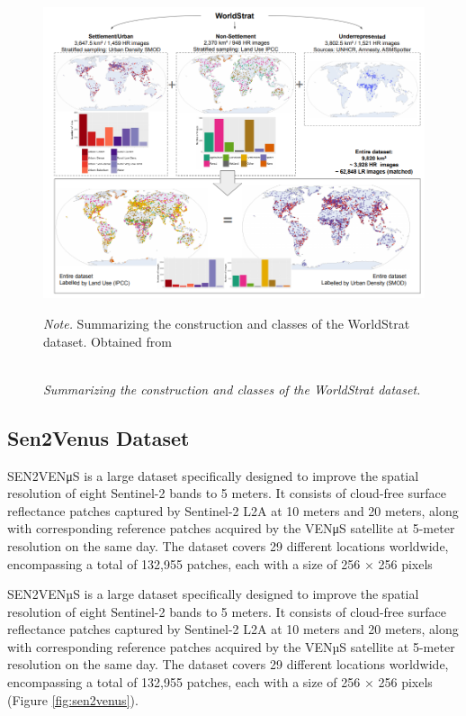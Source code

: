 \begin{figure}[H] 
    \caption{\doublespacing \\ \textit{Summarizing the construction and classes of the WorldStrat dataset.}} 
    \centering
    \includegraphics[width=1\linewidth]{images/csaybar_fig07.png}
    \begin{justify}
        \textit{Note.} Summarizing the construction and classes of the WorldStrat dataset. Obtained from \textcite{cornebise2022open}
    \end{justify}                    
    \label{fig:worldstrat}
\end{figure}


\subsection{Sen2Venus Dataset}

SEN2VENμS is a large dataset specifically designed to improve the spatial resolution of eight Sentinel-2 bands to 5 meters. It consists of cloud-free surface reflectance patches captured by Sentinel-2 L2A at 10 meters and 20 meters, along with corresponding reference patches acquired by the VENμS satellite at 5-meter resolution on the same day. The dataset covers 29 different locations worldwide, encompassing a total of 132,955 patches, each with a size of 256 × 256 pixels 

SEN2VENµS is a large dataset specifically designed to improve the spatial resolution of eight Sentinel-2 bands to 5 meters. It consists of cloud-free surface reflectance patches captured by Sentinel-2 L2A at 10 meters and 20 meters, along with corresponding reference patches acquired by the VENµS satellite at 5-meter resolution on the same day. The dataset covers 29 different locations worldwide, encompassing a total of 132,955 patches, each with a size of 256 × 256 pixels (Figure \ref{fig:sen2venus}).


